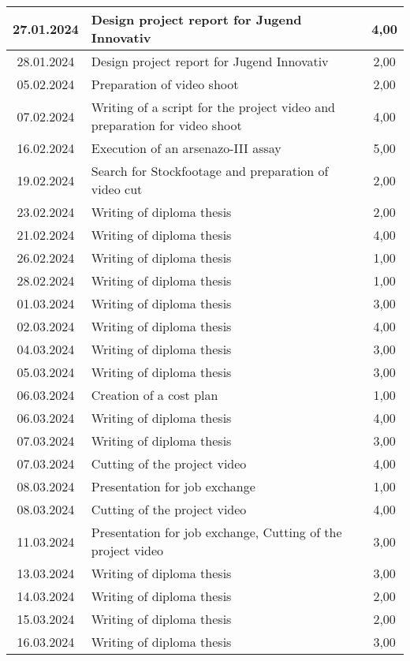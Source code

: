 \begin{longtable}{|c|p{9cm}|c|}
    27.01.2024 & Design project report for Jugend Innovativ & 4,00 \\ \hline
    28.01.2024 & Design project report for Jugend Innovativ & 2,00 \\ \hline
    05.02.2024 & Preparation of video shoot & 2,00 \\ \hline
    07.02.2024 & Writing of a script for the project video and preparation for video shoot & 4,00 \\ \hline
    16.02.2024 & Execution of an arsenazo-III assay & 5,00 \\ \hline
    19.02.2024 & Search for Stockfootage and preparation of video cut & 2,00 \\ \hline
    23.02.2024 & Writing of diploma thesis & 2,00 \\ \hline
    21.02.2024 & Writing of diploma thesis & 4,00 \\ \hline
    26.02.2024 & Writing of diploma thesis & 1,00 \\ \hline
    28.02.2024 & Writing of diploma thesis & 1,00 \\ \hline
    01.03.2024 & Writing of diploma thesis & 3,00 \\ \hline
    02.03.2024 & Writing of diploma thesis & 4,00 \\ \hline
    04.03.2024 & Writing of diploma thesis & 3,00 \\ \hline
    05.03.2024 & Writing of diploma thesis & 3,00 \\ \hline
    06.03.2024 & Creation of a cost plan & 1,00 \\ \hline
    06.03.2024 & Writing of diploma thesis & 4,00 \\ \hline
    07.03.2024 & Writing of diploma thesis & 3,00 \\ \hline
    07.03.2024 & Cutting of the project video & 4,00 \\ \hline
    08.03.2024 & Presentation for job exchange & 1,00 \\ \hline
    08.03.2024 & Cutting of the project video & 4,00 \\ \hline
    11.03.2024 & Presentation for job exchange, Cutting of the project video & 3,00 \\ \hline
    13.03.2024 & Writing of diploma thesis & 3,00 \\ \hline
    14.03.2024 & Writing of diploma thesis & 2,00 \\ \hline
    15.03.2024 & Writing of diploma thesis & 2,00 \\ \hline
    16.03.2024 & Writing of diploma thesis & 3,00 \\ \hline

\end{longtable}

